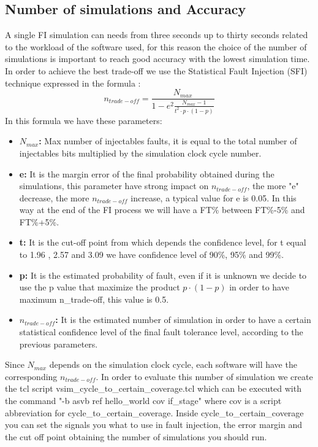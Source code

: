 {{        \subsection{Number of simulations and Accuracy}{
            A single FI simulation can needs from three seconds up to thirty seconds related to the workload of the software used, for this reason the choice of the number of simulations is important to reach good accuracy with the lowest simulation time.
            In order to achieve the best trade-off we use the Statistical Fault Injection (SFI) technique expressed in the formula :
            \begin{equation}
                n_{trade-off} = \dfrac{N_{max}}{1 - e^2 \frac{N_{max}-1}{t^2 \cdot p \cdot (1-p)}}
            \end{equation}    
            In this formula we have these parameters:
            \begin{itemize}
                \item \textbf{$N_{max}$:} Max number of injectables faults, it is equal to the total number of injectables bits multiplied by the simulation clock cycle number.
                \item \textbf{e:} It is the margin error of the final probability obtained during the simulations, this parameter have strong impact on $n_{trade-off}$, the more "e" decrease, the more $n_{trade-off}$ increase, a typical value for e is 0.05. In this way at the end of the FI process we will have a FT\% between FT\%-5\% and FT\%+5\%.
                \item \textbf{t:} It is the cut-off point from which depends the confidence level, for t equal to 1.96 , 2.57 and 3.09 we have confidence level of 90\%, 95\% and 99\%.
                \item \textbf{p:} It is the estimated probability of fault, even if it is unknown we decide to use the p value that maximize the product $p\cdot(1-p)$ in order to have maximum n\_{trade-off}, this value is 0.5.
                \item \textbf{$n_{trade-off}$:} It is the estimated number of simulation in order to have a certain statistical confidence level of the final fault tolerance level, according to the previous parameters.
            \end{itemize}
            
            Since $N_{max}$ depends on the simulation clock cycle, each software will have the corresponding $n_{trade-off}$. 
            In order to evaluate this number of simulation we create the tcl script vsim\_cycle\_to\_certain\_coverage.tcl which can be executed with the command \breakline "-b asvb ref hello\_world cov if\_stage" where cov is a script abbreviation for cycle\_to\_certain\_coverage. Inside cycle\_to\_certain\_coverage you can set the signals you what to use in fault injection, the error margin and the cut off point obtaining the number of simulations you should run.\\
        
}}}
